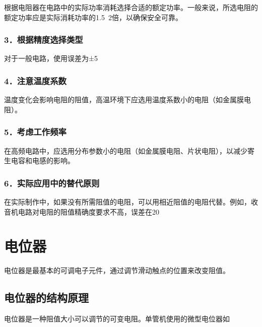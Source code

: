 \documentclass[12pt,UTF8]{ctexbook}
\begin{document}
根据电阻器在电路中的实际功率消耗选择合适的额定功率。一般来说，所选电阻的额定功率应是实际消耗功率的1.5~2倍，以确保安全可靠。

\subsubsection{3．根据精度选择类型}

对于一般电路，使用误差为±5%

\subsubsection{4．注意温度系数}

温度变化会影响电阻的阻值，高温环境下应选用温度系数小的电阻（如金属膜电阻）。

\subsubsection{5．考虑工作频率}

在高频电路中，应选用分布参数小的电阻（如金属膜电阻、片状电阻），以减少寄生电容和电感的影响。

\subsubsection{6．实际应用中的替代原则}

在实际制作中，如果没有所需阻值的电阻，可以用相近阻值的电阻代替。例如，收音机电路对电阻的阻值精确度要求不高，误差在20%

\section{电位器}

电位器是最基本的可调电子元件，通过调节滑动触点的位置来改变阻值。

\subsection{电位器的结构原理}

电位器是一种阻值大小可以调节的可变电阻。单管机使用的微型电位器如%
\end{document}
